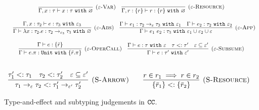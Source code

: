 \begin{figure}

\noindent
{}

\[
\begin{array}{c}

\infer[\textsc{($\varepsilon$-Var)}]
	{ \Gamma, x:\tau \vdash x: \tau~\kw{with} \varnothing }
	{}
	
	~~~
	
\infer[\textsc{($\varepsilon$-Resource)}]
 	{ \Gamma, r: \{ r \} \vdash r : \{ r \}~\kw{with} \varnothing }
 	{} \\[3ex]
 	
 	~~~
	\infer[\textsc{($\varepsilon$-Abs)}]
	{ \Gamma \vdash \lambda x:\tau_2 . e : \tau_2 \rightarrow_{\varepsilon_3} \tau_3~\kw{with} \varnothing }
	{ \Gamma, x: \tau_2 \vdash e: \tau_3~\kw{with} \varepsilon_3 }
	
	~~~
	
\infer[\textsc{($\varepsilon$-App)}]
	{ \Gamma \vdash e_1~e_2 : \tau_3~\kw{with} \varepsilon_1 \cup \varepsilon_2 \cup \varepsilon  }
	{ \Gamma \vdash e_1: \tau_2 \rightarrow_{\varepsilon} \tau_3~\kw{with} \varepsilon_1 & \Gamma \vdash e_2: \tau_2~\kw{with} \varepsilon_2 } \\[3ex]
	
\infer[\textsc{($\varepsilon$-OperCall)}]
	{ \Gamma \vdash e.\pi: \kw{Unit} \kw{with} \{ \bar r.\pi \} }
	{ \Gamma \vdash e: \{ \bar r \} } 

	~~~

\infer[\textsc{($\varepsilon$-Subsume)}]
	{ \Gamma \vdash e: \tau' ~\kw{with} \varepsilon'}
	{ \Gamma \vdash e: \tau ~\kw{with} \varepsilon & \tau <: \tau' & \varepsilon \subseteq \varepsilon'}\\[3ex]
	
	
\end{array}
\]



\[
\begin{array}{c}

\infer[\textsc{(S-Arrow)}]
	{ \tau_1 \rightarrow_{\varepsilon} \tau_2 <: \tau_1' \rightarrow_{\varepsilon'} \tau_2' }
	{ \tau_1' <: \tau_1 & \tau_2 <: \tau_2' & \varepsilon \subseteq \varepsilon' }
~~~~~~
\infer[\textsc{(S-Resource)}]
	{ \{ \bar r_1 \} <: \{ \bar r_2 \} }
	{ r \in r_1 \implies r \in r_2 }

\end{array}
\]


\vspace{-7pt}
\caption{Type-and-effect and subtyping judgements in $\mathtt{CC}$.}
\label{fig:cc_static_rules}
\end{figure}

